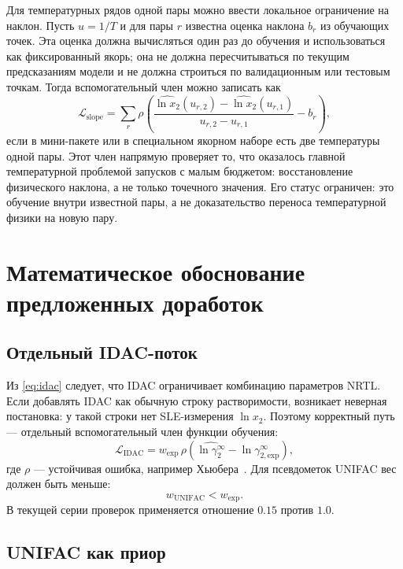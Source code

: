 \documentclass[11pt]{article}
\theoremstyle{definition}
\begin{document}
Для температурных рядов одной пары можно ввести локальное ограничение на наклон. Пусть $u=1/T$ и для пары $r$ известна оценка наклона $b_r$ из обучающих точек. Эта оценка должна вычисляться один раз до обучения и использоваться как фиксированный якорь; она не должна пересчитываться по текущим предсказаниям модели и не должна строиться по валидационным или тестовым точкам. Тогда вспомогательный член можно записать как
\begin{equation*}
    \mathcal L_{\mathrm{slope}}
    = \sum_r \rho\!\left(
        \frac{\widehat{\ln x_2}(u_{r,2})-\widehat{\ln x_2}(u_{r,1})}
             {u_{r,2}-u_{r,1}}
        - b_r
    \right),
\end{equation*}
если в мини-пакете или в специальном якорном наборе есть две температуры одной пары. Этот член напрямую проверяет то, что оказалось главной температурной проблемой запусков с малым бюджетом: восстановление физического наклона, а не только точечного значения. Его статус ограничен: это обучение внутри известной пары, а не доказательство переноса температурной физики на новую пару.

\section{Математическое обоснование предложенных доработок}
\label{app:improvements}

\subsection{Отдельный IDAC-поток}

Из \eqref{eq:idac} следует, что IDAC ограничивает комбинацию параметров NRTL. Если добавлять IDAC как обычную строку растворимости, возникает неверная постановка: у такой строки нет SLE-измерения $\ln x_2$. Поэтому корректный путь --- отдельный вспомогательный член функции обучения:
\begin{equation*}
    \mathcal L_{\mathrm{IDAC}}
    = w_{\mathrm{exp}}\,\rho\!
    \left(\widehat{\ln\gamma_2^{\infty}}-\ln\gamma_{2,\mathrm{exp}}^{\infty}\right),
\end{equation*}
где $\rho$ --- устойчивая ошибка, например Хьюбера~\cite{huber1964}. Для псевдометок UNIFAC вес должен быть меньше:
\begin{equation*}
    w_{\mathrm{UNIFAC}}<w_{\mathrm{exp}}.
\end{equation*}
В текущей серии проверок применяется отношение $0.15$ против $1.0$.

\subsection{UNIFAC как приор}
\end{document}
